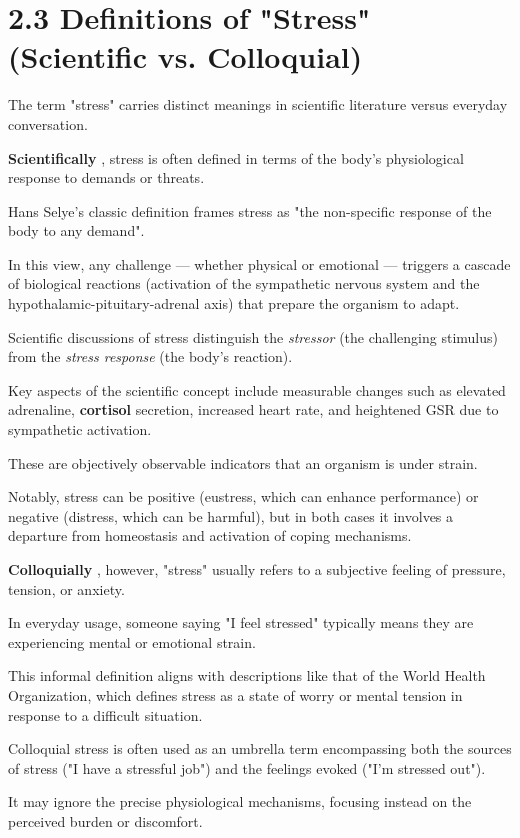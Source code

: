 \section{2.3 Definitions of "Stress" (Scientific vs. Colloquial)}

The term "stress" carries distinct meanings in scientific literature versus everyday conversation.

\textbf{Scientifically}
, stress is often defined in terms of the body's physiological response to demands or threats.

Hans Selye's classic definition frames stress as "the non-specific response of the body to any demand".

In this view, any challenge --- whether physical or emotional --- triggers a cascade of biological reactions (activation of the sympathetic nervous system and the hypothalamic-pituitary-adrenal axis) that prepare the organism to adapt.

Scientific discussions of stress distinguish the \textit{stressor} (the challenging stimulus) from the \textit{stress response} (the body's reaction).

Key aspects of the scientific concept include measurable changes such as elevated adrenaline, \textbf{cortisol}
 secretion, increased heart rate, and heightened GSR due to sympathetic activation.

These are objectively observable indicators that an organism is under strain.

Notably, stress can be positive (eustress, which can enhance performance) or negative (distress, which can be harmful), but in both cases it involves a departure from homeostasis and activation of coping mechanisms.

\textbf{Colloquially}
, however, "stress" usually refers to a subjective feeling of pressure, tension, or anxiety.

In everyday usage, someone saying "I feel stressed" typically means they are experiencing mental or emotional strain.

This informal definition aligns with descriptions like that of the World Health Organization, which defines stress as a state of worry or mental tension in response to a difficult situation.

Colloquial stress is often used as an umbrella term encompassing both the sources of stress ("I have a stressful job") and the feelings evoked ("I'm stressed out").

It may ignore the precise physiological mechanisms, focusing instead on the perceived burden or discomfort.

